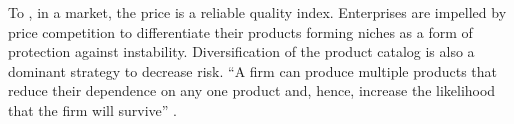\documentclass[a4paper, 12pt, openright, oneside, german, french, brazil, english, article]{abntex2}
\begin{document}
	
	
	To , in a market, the price is a reliable quality index. Enterprises are impelled by price competition to differentiate their products forming niches as a form of protection against instability. Diversification of the product catalog is also a dominant strategy to decrease risk. ``A firm can produce multiple products that reduce their dependence on any one product and, hence, increase the likelihood that the firm will survive'' . 
	
	
\end{document}
